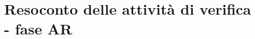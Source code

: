 \documentclass[PianoDiQualifica.tex]{subfiles}
\begin{document}
\section{Resoconto delle attività di verifica - fase AR}
\end{document}
